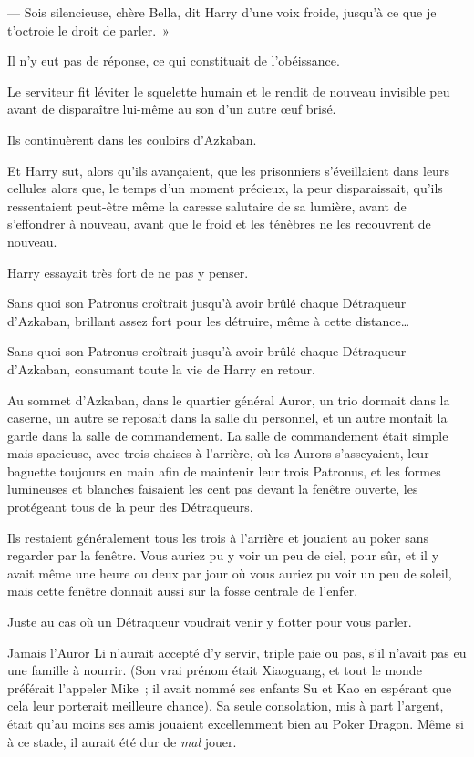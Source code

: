 --- Sois silencieuse, chère Bella, dit Harry d'une voix froide, jusqu'à ce que je t'octroie le droit de parler.~»

Il n'y eut pas de réponse, ce qui constituait de l'obéissance.

Le serviteur fit léviter le squelette humain et le rendit de nouveau invisible peu avant de disparaître lui-même au son d'un autre œuf brisé.

Ils continuèrent dans les couloirs d'Azkaban.

Et Harry sut, alors qu'ils avançaient, que les prisonniers s'éveillaient dans leurs cellules alors que, le temps d'un moment précieux, la peur disparaissait, qu'ils ressentaient peut-être même la caresse salutaire de sa lumière, avant de s'effondrer à nouveau, avant que le froid et les ténèbres ne les recouvrent de nouveau.

Harry essayait très fort de ne pas y penser.

Sans quoi son Patronus croîtrait jusqu'à avoir brûlé chaque Détraqueur d'Azkaban, brillant assez fort pour les détruire, même à cette distance…

Sans quoi son Patronus croîtrait jusqu'à avoir brûlé chaque Détraqueur d'Azkaban, consumant toute la vie de Harry en retour.

\later

Au sommet d'Azkaban, dans le quartier général Auror, un trio dormait dans la caserne, un autre se reposait dans la salle du personnel, et un autre montait la garde dans la salle de commandement. La salle de commandement était simple mais spacieuse, avec trois chaises à l'arrière, où les Aurors s'asseyaient, leur baguette toujours en main afin de maintenir leur trois Patronus, et les formes lumineuses et blanches faisaient les cent pas devant la fenêtre ouverte, les protégeant tous de la peur des Détraqueurs.

Ils restaient généralement tous les trois à l'arrière et jouaient au poker sans regarder par la fenêtre. Vous auriez pu y voir un peu de ciel, pour sûr, et il y avait même une heure ou deux par jour où vous auriez pu voir un peu de soleil, mais cette fenêtre donnait aussi sur la fosse centrale de l'enfer.

Juste au cas où un Détraqueur voudrait venir y flotter pour vous parler.

Jamais l'Auror Li n'aurait accepté d'y servir, triple paie ou pas, s'il n'avait pas eu une famille à nourrir. (Son vrai prénom était Xiaoguang, et tout le monde préférait l'appeler Mike~; il avait nommé ses enfants Su et Kao en espérant que cela leur porterait meilleure chance). Sa seule consolation, mis à part l'argent, était qu'au moins ses amis jouaient excellemment bien au Poker Dragon. Même si à ce stade, il aurait été dur de \emph{mal} jouer.

